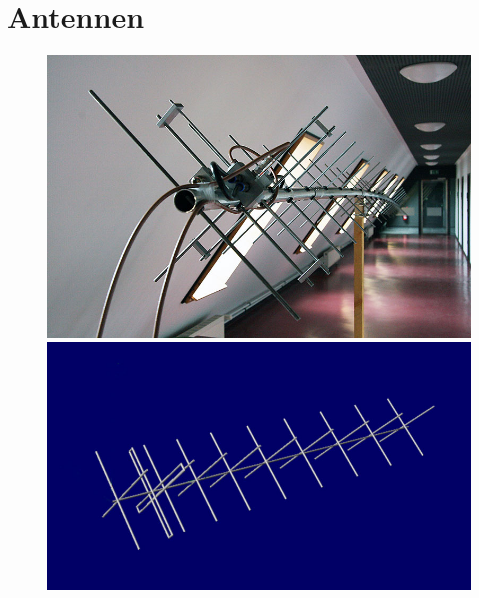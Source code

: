 \section{Antennen}
\begin{figure}
  \centering
	\begin{minipage}[t]{0.3\textwidth}
		\includegraphics[width=\textwidth]{images/antenne}
	\end{minipage}
	\begin{minipage}[t]{0.3\textwidth}
		\includegraphics[width=\textwidth]{images/antenne2}
	\end{minipage}
	\begin{minipage}[t]{0.2\textwidth}

\end{minipage}
\end{figure}
